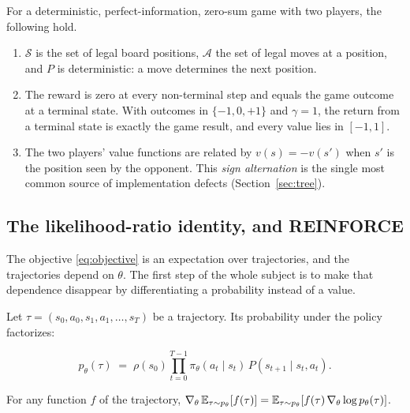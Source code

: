 \begin{remark}
For a deterministic, perfect-information, zero-sum game with two players, the
following hold.
\begin{enumerate}
  \item $\mathcal{S}$ is the set of legal board positions, $\mathcal{A}$ the set
        of legal moves at a position, and $P$ is deterministic: a move
        determines the next position.
  \item The reward is zero at every non-terminal step and equals the game
        outcome at a terminal state. With outcomes in $\{-1, 0, +1\}$ and
        $\gamma = 1$, the return from a terminal state is exactly the game
        result, and every value lies in $[-1,1]$.
  \item The two players' value functions are related by $v(s) = -v(s')$ when
        $s'$ is the position seen by the opponent. This \emph{sign alternation}
        is the single most common source of implementation defects
        (Section~\ref{sec:tree}).
\end{enumerate}
\end{remark}

\subsection{The likelihood-ratio identity, and REINFORCE}
\label{sec:reinforce}

The objective \eqref{eq:objective} is an expectation over trajectories, and
the trajectories depend on $\theta$. The first step of the whole subject is to
make that dependence disappear by differentiating a probability instead of a
value.

Let $\tau = (s_0, a_0, s_1, a_1, \dots, s_T)$ be a trajectory. Its probability
under the policy factorizes:

\begin{equation}
p_\theta(\tau) \;=\; \rho(s_0) \prod_{t=0}^{T-1}
\pi_\theta(a_t \mid s_t)\, P(s_{t+1} \mid s_t, a_t).
\label{eq:trajprob}
\end{equation}

\begin{proposition}
\label{prop:likelihood-ratio}
For any function $f$ of the trajectory,
$\nabla_\theta\, \mathbb{E}_{\tau \sim p_\theta}[f(\tau)] =
\mathbb{E}_{\tau \sim p_\theta}\!\left[ f(\tau)\, \nabla_\theta \log p_\theta(\tau) \right]$.
\end{proposition}

